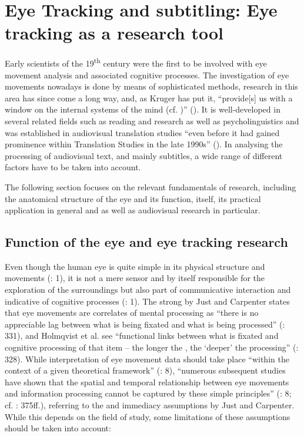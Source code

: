 \chapter{Eye Tracking and subtitling: Eye tracking as a research tool}\label{eyetracking}

Early scientists of the 19\textsuperscript{th} century were the first to be involved with eye movement analysis and associated cognitive processes. The investigation of eye movements nowadays is done by means of sophisticated  methods, research in this area has since come a long way, and, as Kruger has put it,  “provide[s] us with a window on the internal systems of the mind (cf. \citealt{marchant2009})” (\citealt{Kruger????}). It is well-developed in several related fields such as reading and  research as well as psycholinguistics and was established in audiovisual translation studies “even before it had gained prominence within Translation Studies in the late 1990s” (\citealt{Kruger????}). In analysing the processing of audiovisual text, and mainly subtitles, a wide range of different factors have to be taken into account.

The following section focuses on the relevant fundamentals of  research, including the anatomical structure of the eye and its function,  itself, its practical application in general and  as well as audiovisual research in particular.

\section{Function of the eye and eye tracking research}\label{sec:6.1}

Even though the human eye is quite simple in its physical structure and movements (\citealt{Joos-Helmert2005}: 1), it is not a mere sensor and by itself responsible for the exploration of the surroundings but also part of communicative interaction and indicative of cognitive processes (\citeyear{Joos-Helmert2005}: 1). The strong  by Just and Carpenter states that eye movements are correlates of mental processing as “there is no appreciable lag between what is being fixated and what is being processed” (\citeyear{Just1980}: 331), and Holmqvist et al. see “functional links between what is fixated and cognitive processing of that item – the longer the , the ‘deeper’ the processing” (\citeyear{Holmqvist2011}: 328). While interpretation of eye movement data should take place “within the context of a given theoretical framework” (\citealt{radach-kennedy2004}: 8), “numerous subsequent studies have shown that the spatial and temporal relationship between eye movements and information processing cannot be captured by these simple principles” (\citealt{radach-kennedy2004}: 8; cf. \citealt{rayner1998}: 375ff.), referring to the  and immediacy assumptions by Just and Carpenter. While this depends on the field of study, some limitations of these assumptions should be taken into account:

